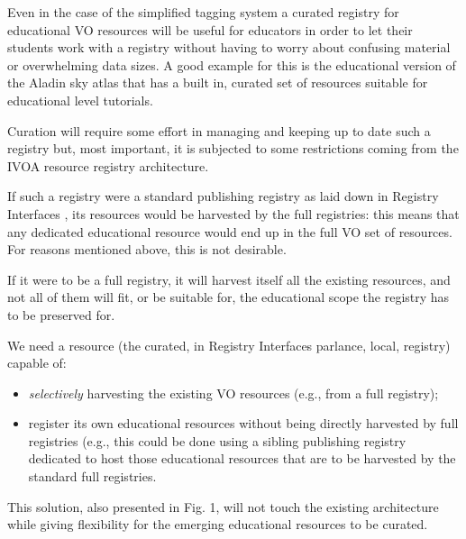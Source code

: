 \documentclass{ivoa}
\begin{document}
\label{sect:edureg}


Even in the case of the simplified 
tagging system
a curated registry for educational VO resources will be useful for
educators in order to let their students work with a registry without having to
worry about confusing material or overwhelming data sizes. A good example
for this is the educational version of the Aladin sky atlas that has a
built in, curated set of resources suitable for educational level 
tutorials.
  


Curation will require some effort in managing and keeping up to date
such a registry but, most important, it is subjected to  some restrictions coming from
the IVOA resource registry architecture. 
  


If such a registry were a standard publishing registry as laid down in
Registry Interfaces
\citep{2009ivoa.spec.1104B},
its resources would be harvested by the full registries: this means 
that any dedicated educational resource would end up in the full VO 
set of resources.  For reasons mentioned above, this is not
desirable.


If it were to be a full registry, it will harvest itself all the existing
resources, and not all of them will fit, or be suitable for, the educational
scope the registry has to be preserved for.
  


We need a resource (the curated, in Registry Interfaces
parlance, local, registry) capable of:
  
\begin{itemize}

\item 
\emph{selectively}
 harvesting the existing VO resources 
	(e.g., from a full registry);{}

\item register its own educational resources without being directly
	harvested by full registries (e.g., this could be done using a
	sibling publishing registry dedicated to host those educational
	resources that are to be harvested by the standard full registries.{}

\end{itemize}

This solution, also presented in Fig. 1, will not touch the existing architecture
while giving flexibility for the emerging educational resources to 
be curated.
  
\end{document}
